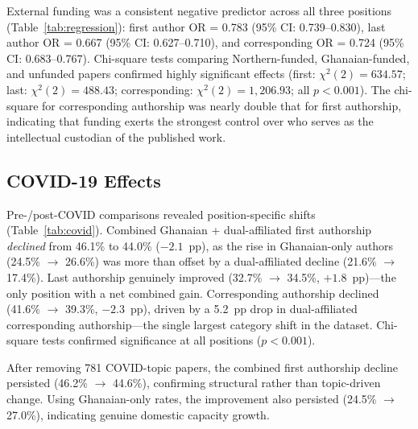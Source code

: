 \documentclass[12pt, a4paper]{article}
\begin{document}
External funding was a consistent negative predictor across all three positions (Table~\ref{tab:regression}): first author OR = 0.783 (95\% CI: 0.739--0.830), last author OR = 0.667 (95\% CI: 0.627--0.710), and corresponding OR = 0.724 (95\% CI: 0.683--0.767). Chi-square tests comparing Northern-funded, Ghanaian-funded, and unfunded papers confirmed highly significant effects (first: $\chi^2(2) = 634.57$; last: $\chi^2(2) = 488.43$; corresponding: $\chi^2(2) = 1{,}206.93$; all $p < 0.001$). The chi-square for corresponding authorship was nearly double that for first authorship, indicating that funding exerts the strongest control over who serves as the intellectual custodian of the published work.

\subsection{COVID-19 Effects}

Pre-/post-COVID comparisons revealed position-specific shifts (Table~\ref{tab:covid}). Combined Ghanaian + dual-affiliated first authorship \emph{declined} from 46.1\% to 44.0\% ($-2.1$~pp), as the rise in Ghanaian-only authors (24.5\% $\rightarrow$ 26.6\%) was more than offset by a dual-affiliated decline (21.6\% $\rightarrow$ 17.4\%). Last authorship genuinely improved (32.7\% $\rightarrow$ 34.5\%, $+1.8$~pp)---the only position with a net combined gain. Corresponding authorship declined (41.6\% $\rightarrow$ 39.3\%, $-2.3$~pp), driven by a 5.2~pp drop in dual-affiliated corresponding authorship---the single largest category shift in the dataset. Chi-square tests confirmed significance at all positions ($p < 0.001$).

After removing 781 COVID-topic papers, the combined first authorship decline persisted (46.2\% $\rightarrow$ 44.6\%), confirming structural rather than topic-driven change. Using Ghanaian-only rates, the improvement also persisted (24.5\% $\rightarrow$ 27.0\%), indicating genuine domestic capacity growth.
\end{document}
